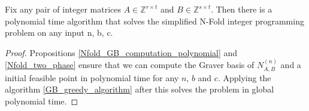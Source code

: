 \begin{theorem}
Fix any pair of integer matrices $A \in \mathbb{Z}^{r \times t}$ and $B \in \mathbb{Z}^{s \times t}$. Then there is a polynomial time algorithm that solves the simplified N-Fold integer programming problem on any input n, b, c.
\end{theorem}
\vspace{-15pt} %
\begin{proof}
Propositions \ref{Nfold_GB_computation_polynomial} and \ref{Nfold_two_phase} ensure that we can compute the  Graver basis of $N_{A,B}^{(n)}$ and a initial feasible point in polynomial time for any $n$, $b$ and $c$. Applying the algorithm \ref{GB_greedy_algorithm} after this solves the problem in global polynomial time.
\end{proof}

